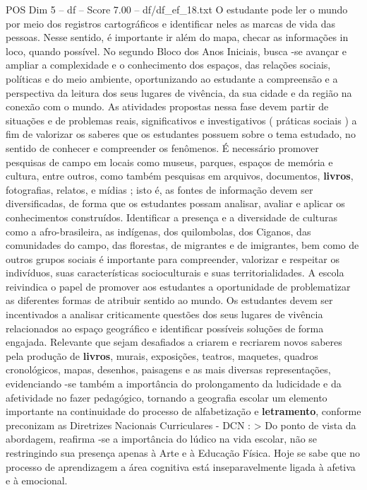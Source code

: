 \begin{textsample}{POS Dim 5 – df – Score 7.00 – df/df\_ef\_18.txt}
O estudante pode ler o mundo por meio dos registros cartográficos e identificar neles as marcas de vida das pessoas.
Nesse sentido, é importante ir além do mapa, checar as informações in loco, quando possível.
No segundo Bloco dos Anos Iniciais, busca -se avançar e ampliar a complexidade e o conhecimento dos espaços, das relações sociais, políticas e do meio ambiente, oportunizando ao estudante a compreensão e a perspectiva da leitura dos seus lugares de vivência, da sua cidade e da região na conexão com o mundo.
As atividades propostas nessa fase devem partir de situações e de problemas reais, significativos e investigativos ( práticas sociais ) a fim de valorizar os saberes que os estudantes possuem sobre o tema estudado, no sentido de conhecer e compreender os fenômenos.
É necessário promover pesquisas de campo em locais como museus, parques, espaços de memória e cultura, entre outros, como também pesquisas em arquivos, documentos, \textbf{livros}, fotografias, relatos, e mídias ; isto é, as fontes de informação devem ser diversificadas, de forma que os estudantes possam analisar, avaliar e aplicar os conhecimentos construídos.
Identificar a presença e a diversidade de culturas como a afro-brasileira, as indígenas, dos quilombolas, dos Ciganos, das comunidades do campo, das florestas, de migrantes e de imigrantes, bem como de outros grupos sociais é importante para compreender, valorizar e respeitar os indivíduos, suas características socioculturais e suas territorialidades.
A escola reivindica o papel de promover aos estudantes a oportunidade de problematizar as diferentes formas de atribuir sentido ao mundo.
Os estudantes devem ser incentivados a analisar criticamente questões dos seus lugares de vivência relacionados ao espaço geográfico e identificar possíveis soluções de forma engajada.
Relevante que sejam desafiados a criarem e recriarem novos saberes pela produção de \textbf{livros}, murais, exposições, teatros, maquetes, quadros cronológicos, mapas, desenhos, paisagens e as mais diversas representações, evidenciando -se também a importância do prolongamento da ludicidade e da afetividade no fazer pedagógico, tornando a geografia escolar um elemento importante na continuidade do processo de alfabetização e \textbf{letramento}, conforme preconizam as Diretrizes Nacionais Curriculares - DCN : > Do ponto de vista da abordagem, reafirma -se a importância do lúdico na vida escolar, não se restringindo sua presença apenas à Arte e à Educação Física.
Hoje se sabe que no processo de aprendizagem a área cognitiva está inseparavelmente ligada à afetiva e à emocional.

\end{textsample}
